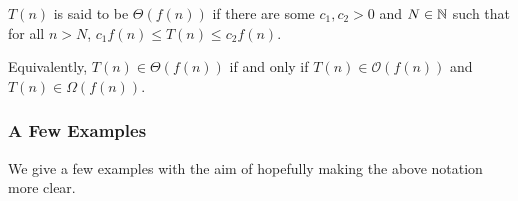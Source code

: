 \begin{definition}
$T(n)$ is said to be $\Theta(f(n))$ if there are some $c_1,c_2> 0$ and $N\in\mathbb{N}$ such that for all $n>N$, $c_1 f(n) \leq T(n)\leq c_2 f(n)$.\\
\end{definition}

Equivalently, $T(n) \in \Theta(f(n))$ if and only if $T(n) \in \mathcal{O}(f(n))$ and $T(n) \in \Omega(f(n))$.

\subsubsection{A Few Examples}

We give a few examples with the aim of hopefully making the above notation more clear.

